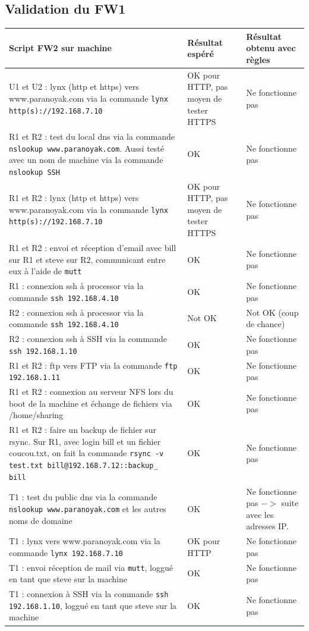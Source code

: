 \documentclass[11pt,a4paper]{article}
\begin{document}
\subsection{Validation du FW1}
\begin{longtable}{|p{8cm}|p{3cm}|p{3cm}|}
\hline
Script FW2 sur machine & Résultat espéré & Résultat obtenu avec règles\\
\hline
U1 et U2 : lynx (http et https) vers www.paranoyak.com via la commande \texttt{lynx http(s)://192.168.7.10} &  OK pour HTTP, pas moyen de tester HTTPS  & Ne fonctionne pas \\
\hline 
R1 et R2 : test du local dns via la commande \texttt{nslookup www.paranoyak.com}. Aussi testé avec un nom de machine via la commande \texttt{nslookup SSH} \ & OK  & Ne fonctionne pas  \\
\hline 
R1 et R2 : lynx (http et https) vers www.paranoyak.com via la commande \texttt{lynx http(s)://192.168.7.10} &  OK pour HTTP, pas moyen de tester HTTPS & Ne fonctionne pas \\
\hline 
R1 et R2 : envoi et réception d'email avec bill sur R1 et steve sur R2, communicant entre eux à l'aide de \texttt{mutt} & OK & Ne fonctionne pas \\
\hline 
R1 : connexion ssh à processor via la commande \texttt{ssh 192.168.4.10} & OK & Ne fonctionne pas \\
\hline
R2 : connexion ssh à processor via la commande \texttt{ssh 192.168.4.10} & Not OK & Not OK (coup de chance)\\
\hline
R2 : connexion ssh à SSH via la commande \texttt{ssh 192.168.1.10} & OK & Ne fonctionne pas\\
\hline
R1 et R2 : ftp vers FTP via la commande \texttt{ftp 192.168.1.11} & OK & Ne fonctionne pas  \\
\hline
R1 et R2 : connexion au serveur NFS lors du boot de la machine et échange de fichiers via /home/sharing & OK & Ne fonctionne pas \\
\hline
R1 et R2 : faire un backup de fichier sur rsync. Sur R1, avec login bill et un fichier coucou.txt, on fait la commande \texttt{rsync -v test.txt bill@192.168.7.12::backup\_ bill} & OK & Ne fonctionne pas \\
\hline
T1 : test du public dns via la commande \texttt{nslookup www.paranoyak.com} et les autres noms de domaine & OK  & Ne fonctionne pas $->$ suite avec les adresses IP.  \\
\hline 
T1 : lynx vers www.paranoyak.com via la commande \texttt{lynx 192.168.7.10} & OK pour HTTP & Ne fonctionne pas \\
\hline 
T1 : envoi réception de mail via \texttt{mutt}, loggué en tant que steve sur la machine & OK & Ne fonctionne pas \\
\hline
T1 : connexion à SSH via la commande \texttt{ssh 192.168.1.10}, loggué en tant que steve sur la machine & OK & Ne fonctionne pas \\
\hline
\end{longtable}
\end{document}
